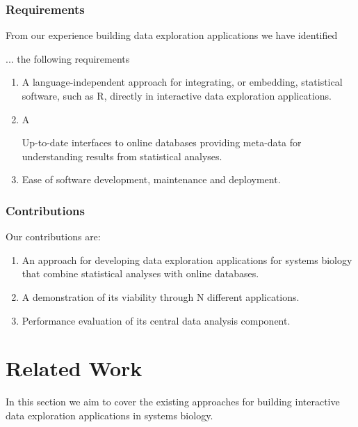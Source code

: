 

\subsubsection*{Requirements} 
From our experience building data exploration applications we have identified

... the
following requirements 

\begin{enumerate}
    \item A language-independent approach for integrating, or embedding,
        statistical software, such as R, directly in interactive data
        exploration applications.
    \item A 
        
        Up-to-date interfaces to online databases providing meta-data for
        understanding results from statistical analyses.
    \item Ease of software development, maintenance and deployment. 
\end{enumerate} 

\subsubsection*{Contributions} 
Our contributions are: 
\begin{enumerate}
\item An approach for developing data exploration applications for systems
biology that combine statistical analyses with online databases.  
\item A demonstration of its viability through N different applications. 
\item Performance evaluation of its central data analysis component. 
\end{enumerate} 


\section*{Related Work} 
In this section we aim to cover the existing approaches for building interactive
data exploration applications in systems biology. 


